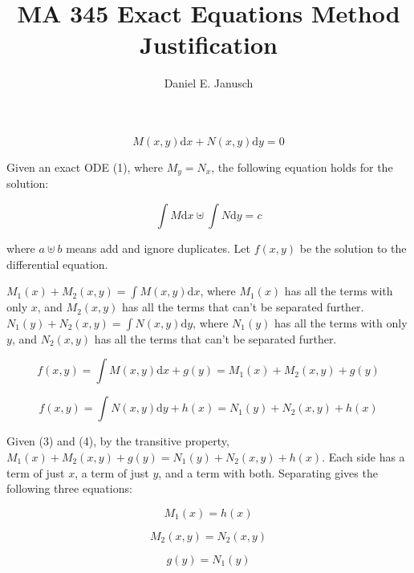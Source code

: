\documentclass[12pt]{article}
\newcommand \dstyle \displaystyle
\renewcommand \d [1] {\mathrm{d}{#1}}
\newcommand \dx {{\d x}}
\newcommand \dy {{\d y}}
\begin{document}

\title{MA 345 Exact Equations Method Justification}
\author{Daniel E. Janusch}
\maketitle

\vspace{-10px}

\begin{equation}
	M(x,y) \dx + N(x,y) \dy = 0
\end{equation}

Given an exact ODE (1), where $M_y = N_x$, the following equation holds for the solution:

\begin{equation}
	\int M \dx \uplus \int N \dy = c
\end{equation}

where $a \uplus b$ means add and ignore duplicates. Let $f(x, y)$ be the solution to the differential equation. 

$\dstyle M_1(x) + M_2(x, y) = \int M(x, y) \dx$, where $M_1(x)$ has all the terms with only $x$, and $M_2(x, y)$ has all the terms that can't be separated further. $\dstyle N_1(y) + N_2(x, y) = \int N(x, y) \dy$, where $N_1(y)$ has all the terms with only $y$, and $N_2(x, y)$ has all the terms that can't be separated further.

\begin{equation}
	f(x, y) = \int M(x, y) \dx + g(y) = M_1(x) + M_2(x, y) + g(y)
\end{equation}

\begin{equation}
	f(x, y) = \int N(x, y) \dy + h(x) = N_1(y) + N_2(x, y) + h(x)
\end{equation}

Given (3) and (4), by the transitive property, $M_1(x) + M_2(x, y) + g(y) = N_1(y) + N_2(x, y) + h(x)$. Each side has a term of just $x$, a term of just $y$, and a term with both. Separating gives the following three equations:

\begin{equation}
	M_1(x) = h(x)
\end{equation}

\begin{equation}
	M_2(x, y) = N_2(x, y)
\end{equation}

\begin{equation}
	g(y) = N_1(y)
\end{equation}
\end{document}
